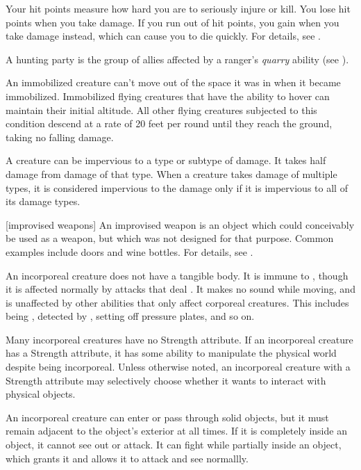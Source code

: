  Your hit points measure how hard you are to seriously injure or kill.
You lose hit points when you take damage.
If you run out of hit points, you gain  when you take damage instead, which can cause you to die quickly.
For details, see .

 A hunting party is the group of allies affected by a ranger's \textit{quarry} ability (see ).

 An immobilized creature can't move out of the space it was in when it became immobilized.
Immobilized flying creatures that have the ability to hover can maintain their initial altitude.
All other flying creatures subjected to this condition descend at a rate of 20 feet per round until they reach the ground, taking no falling damage.

 A creature can be impervious to a type or subtype of damage.
It takes half damage from damage of that type.
When a creature takes damage of multiple types, it is considered impervious to the damage only if it is impervious to all of its damage types.

[improvised weapons] An improvised weapon is an object which could conceivably be used as a weapon, but which was not designed for that purpose.
Common examples include doors and wine bottles.
For details, see .

 An incorporeal creature does not have a tangible body.
It is immune to , though it is affected normally by attacks that deal .
It makes no sound while moving, and is unaffected by other abilities that only affect corporeal creatures.
This includes being , detected by , setting off pressure plates, and so on.

Many incorporeal creatures have no Strength attribute.
If an incorporeal creature has a Strength attribute, it has some ability to manipulate the physical world despite being incorporeal.
Unless otherwise noted, an incorporeal creature with a Strength attribute may selectively choose whether it wants to interact with physical objects.

An incorporeal creature can enter or pass through solid objects, but it must remain adjacent to the object's exterior at all times.
If it is completely inside an object, it cannot see out or attack.
It can fight while partially inside an object, which grants it  and allows it to attack and see normallly.

